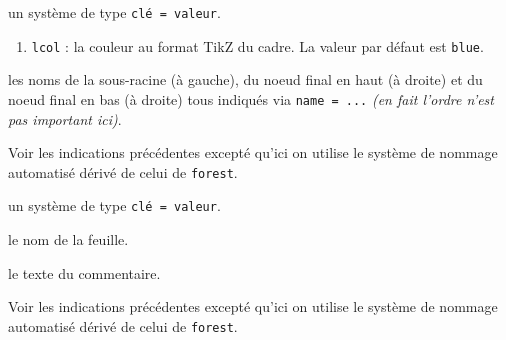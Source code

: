 \documentclass[12pt,a4paper]{article}
\begin{document}


\separation


 \hfill {}

\IDoption{} un système de type \texttt{clé = valeur}.

\begin{enumerate}
    \item \verb#lcol# : la couleur au format TikZ du cadre. La valeur par défaut est \verb#blue#.
\end{enumerate}


 les noms de la sous-racine (à gauche), du noeud final en haut (à droite) et du noeud final en bas (à droite) tous indiqués via \verb#name = ...# \emph{(en fait l'ordre n'est pas important ici)}.


\bigskip


 \hfill {}

\extraspace
\extraspace

Voir les indications précédentes excepté qu'ici on utilise le système de nommage automatisé dérivé de celui de \verb#forest#.




\separation



\IDoption{} un système de type \texttt{clé = valeur}.


 le nom de la feuille.

 le texte du commentaire.


\bigskip



\extraspace
\extraspace

Voir les indications précédentes excepté qu'ici on utilise le système de nommage automatisé dérivé de celui de \verb#forest#.
\end{document}
